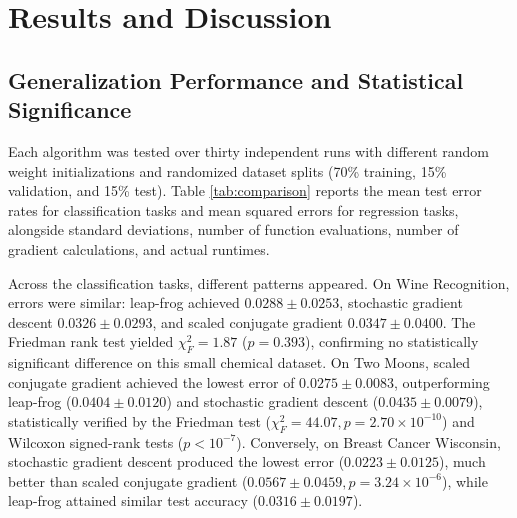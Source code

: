 \documentclass[conference,10pt]{IEEEtran}
\begin{document}
\begin{table}[t]
\centering
\caption{Selected Control Parameters across Benchmark Problems}
\label{tab:tuned_params}
\end{table}

\section{Results and Discussion}

\subsection{Generalization Performance and Statistical Significance}
Each algorithm was tested over thirty independent runs with different random weight initializations and randomized dataset splits (70\% training, 15\% validation, and 15\% test). Table \ref{tab:comparison} reports the mean test error rates for classification tasks and mean squared errors for regression tasks, alongside standard deviations, number of function evaluations, number of gradient calculations, and actual runtimes.

Across the classification tasks, different patterns appeared. On Wine Recognition, errors were similar: leap-frog achieved $0.0288 \pm 0.0253$, stochastic gradient descent $0.0326 \pm 0.0293$, and scaled conjugate gradient $0.0347 \pm 0.0400$. The Friedman rank test yielded $\chi_F^2 = 1.87$ ($p = 0.393$), confirming no statistically significant difference on this small chemical dataset. On Two Moons, scaled conjugate gradient achieved the lowest error of $0.0275 \pm 0.0083$, outperforming leap-frog ($0.0404 \pm 0.0120$) and stochastic gradient descent ($0.0435 \pm 0.0079$), statistically verified by the Friedman test ($\chi_F^2 = 44.07, p = 2.70 \times 10^{-10}$) and Wilcoxon signed-rank tests ($p < 10^{-7}$). Conversely, on Breast Cancer Wisconsin, stochastic gradient descent produced the lowest error ($0.0223 \pm 0.0125$), much better than scaled conjugate gradient ($0.0567 \pm 0.0459, p = 3.24 \times 10^{-6}$), while leap-frog attained similar test accuracy ($0.0316 \pm 0.0197$).
\end{document}
